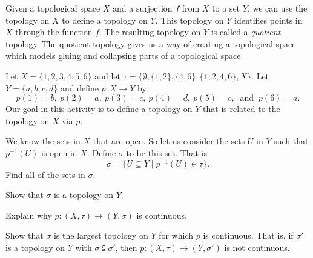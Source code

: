 Given a topological space $X$ and a surjection $f$ from $X$ to a set $Y$, we can use the topology on $X$ to define a topology on $Y$. This topology on $Y$ identifies points in $X$ through the function $f$. The resulting topology on $Y$ is called a \emph{quotient} topology. The quotient topology gives us a way of creating a topological space which models gluing and collapsing parts of a topological space.

\begin{pa} Let $X = \{1,2,3,4,5,6\}$ and let $\tau = \{\emptyset, \{1,2\},\{4,6\}, \{1,2,4,6\},X\}$. Let $Y = \{a,b,c,d\}$ and define $p: X \to Y$ by 
\[p(1) = b, \ p(2) = a, \ p(3) = c, \ p(4) = d, \ p(5) = c, \ \text{ and } \ p(6) = a.\] 
Our goal in this activity is to define a topology on $Y$ that is related to the topology on $X$ via $p$. 
\be
\item We know the sets in $X$ that are open. So let us consider the sets $U$ in $Y$ such that $p^{-1}(U)$ is open in $X$. Define $\sigma$ to be this set. That is
\[\sigma = \{U \subseteq Y \mid p^{-1}(U) \in \tau\}.\]
Find all of the sets in $\sigma$. 

\item Show that $\sigma$ is a topology on $Y$.

\item Explain why $p : (X, \tau) \to (Y, \sigma)$ is continuous.

\item Show that $\sigma$ is the largest topology on $Y$ for which $p$ is continuous. That is, if $\sigma'$ is a topology on $Y$ with $\sigma \subsetneqq \sigma'$, then $p: (X,\tau) \to (Y, \sigma')$ is not continuous.

\ee

\end{pa}

